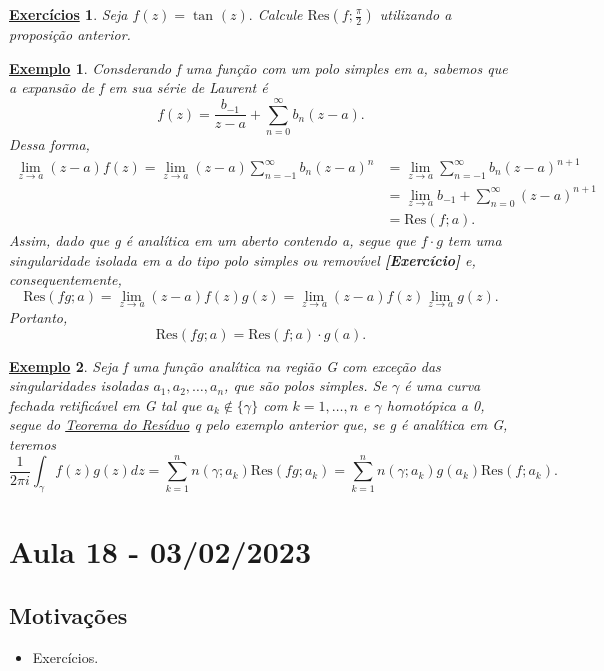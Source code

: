 \documentclass{article}
\newtheorem{example}{\underline{Exemplo}}[section]
\newtheorem*{exer*}{\underline{Exerc\'icios}}
\begin{document}
  \begin{exer*}
    Seja \(f(z) = \tan^{}{(z)}.\) Calcule \(\mathrm{Res}(f; \frac{\pi }{2})\) utilizando a proposição anterior.
  \end{exer*}
  \begin{example}
    Consderando f uma função com um polo simples em a, sabemos que a expansão de f em sua série de Laurent é 
    \[
      f(z) = \frac{b_{-1}}{z-a} + \sum\limits_{n=0}^{\infty}b_{n}(z-a).
    \]
    Dessa forma,
    \begin{align*}
      \lim_{z\to a}(z-a)f(z) = \lim_{z\to a}(z-a)\sum\limits_{n=-1}^{\infty}b_{n}(z-a)^{n} &= \lim_{z\to a}\sum\limits_{n=-1}^{\infty}b_{n}(z-a)^{n+1}\\
                                                                                           &= \lim_{z\to a}b_{-1} + \sum\limits_{n=0}^{\infty}(z-a)^{n+1}\\
                                                                                           &= \mathrm{Res}(f; a).
    \end{align*}
    Assim, dado que g é analítica em um aberto contendo a, segue que \(f \cdot g\) tem uma singularidade isolada em a do tipo polo simples
    ou removível \textbf{[Exercício]} e, consequentemente, 
    \[
      \mathrm{Res}(fg; a) = \lim_{z\to a}(z-a)f(z)g(z) = \lim_{z\to a}(z-a)f(z)\lim_{z\to a}g(z).
    \]
    Portanto, 
    \[
      \mathrm{Res}(fg; a) = \mathrm{Res}(f; a)\cdot g(a).
    \]
  \end{example}
  \begin{example}
    Seja f uma função analítica na região G com exceção das singularidades isoladas \(a_{1}, a_{2}, \dotsc , a_{n}\), que são polos simples.
    Se \(\gamma \) é uma curva fechada retificável em G tal que \(a_{k}\not\in \{\gamma \}\) com \(k=1,\dotsc ,n \) e \(\gamma \) homotópica a 0,
    segue do \hyperlink{residue}{Teorema do Resíduo} q pelo exemplo anterior que, se g é analítica em G, teremos 
    \[
      \frac{1}{2\pi i}\int_{\gamma }^{}f(z)g(z)dz = \sum\limits_{k=1}^{n}n(\gamma ; a_{k})\mathrm{Res}(fg; a_{k}) = \sum\limits_{k=1}^{n}n(\gamma ; a_{k})g(a_{k})\mathrm{Res}(f; a_{k}).
    \]
  \end{example}
  \newpage

  \section{Aula 18 - 03/02/2023}
  \subsection{Motivações} 
  \begin{itemize}
     \item Exercícios.
   \end{itemize}
\end{document}
